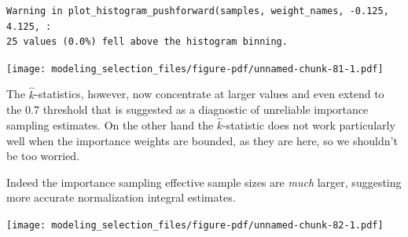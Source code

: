 \documentclass[
  letterpaper,
  DIV=11,
  numbers=noendperiod]{scrartcl}
\newenvironment{Shaded}{\begin{snugshade}}{\end{snugshade}}
\newcommand{\AttributeTok}[1]{\textcolor[rgb]{0.40,0.45,0.13}{#1}}
\newcommand{\DecValTok}[1]{\textcolor[rgb]{0.68,0.00,0.00}{#1}}
\newcommand{\FloatTok}[1]{\textcolor[rgb]{0.68,0.00,0.00}{#1}}
\newcommand{\FunctionTok}[1]{\textcolor[rgb]{0.28,0.35,0.67}{#1}}
\newcommand{\NormalTok}[1]{\textcolor[rgb]{0.00,0.23,0.31}{#1}}
\newcommand{\SpecialCharTok}[1]{\textcolor[rgb]{0.37,0.37,0.37}{#1}}
\newcommand{\StringTok}[1]{\textcolor[rgb]{0.13,0.47,0.30}{#1}}
\begin{document}
\begin{verbatim}
Warning in plot_histogram_pushforward(samples, weight_names, -0.125, 4.125, :
25 values (0.0%) fell above the histogram binning.
\end{verbatim}

\texttt{[image: modeling\_selection\_files/figure-pdf/unnamed-chunk-81-1.pdf]}

The \(\hat{k}\)-statistics, however, now concentrate at larger values
and even extend to the 0.7 threshold that is suggested as a diagnostic
of unreliable importance sampling estimates. On the other hand the
\(\hat{k}\)-statistic does not work particularly well when the
importance weights are bounded, as they are here, so we shouldn't be too
worried.

Indeed the importance sampling effective sample sizes are \emph{much}
larger, suggesting more accurate normalization integral estimates.

\begin{Shaded}
\end{Shaded}

\texttt{[image: modeling\_selection\_files/figure-pdf/unnamed-chunk-82-1.pdf]}
\end{document}
